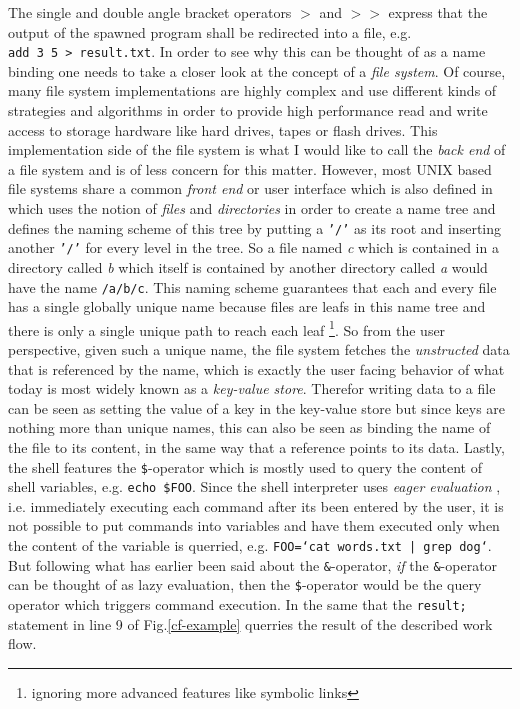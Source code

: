 The single and double angle bracket operators $>$ and $>>$
express that the output of the spawned program shall be redirected into
a file, e.g. \texttt{add\ 3\ 5\ >\ result.txt}. In order to see why this
can be thought of as a name binding one needs to take a closer look
at the concept of a \textit{file system}. Of course, many file
system implementations are highly complex and use different kinds of
strategies and algorithms in order to provide high performance read
and write access to storage hardware like hard drives, tapes or flash
drives. This implementation side of the file system is what I would
like to call the \textit{back end} of a file system and is of less
concern for this matter. However, most
UNIX based file systems share a common \textit{front end} or user
interface which is also defined in \cite{unix78} which uses the notion
of \textit{files} and \textit{directories} in order to create a name tree
and defines the naming scheme of this tree by putting a \texttt{'/'} as its
root and inserting another \texttt{'/'} for every level in the tree. So
a file named \textit{c} which is contained in a directory called \textit{b}
which itself is contained by another directory called \textit{a} would
have the name \texttt{/a/b/c}.
This naming scheme guarantees that each and every file has a single
globally unique name because files are leafs in this name tree and
there is only a single unique path to reach each leaf
\footnote{ignoring more advanced features like symbolic links}.
So from the user perspective, given such a unique name, the file system
fetches the \textit{unstructed} data that is referenced by the name,
which is exactly the user facing behavior of what today is most widely
known as a \textit{key-value store}.
Therefor writing data to a file can be seen as setting the value of
a key in the key-value store but since keys are nothing more than
unique names, this can also be seen as binding the name of the file
to its content, in the same way that a reference points to its data.
\newline
Lastly, the shell features the \texttt{\$}-operator which is mostly used to
query the content of shell variables, e.g. \texttt{echo \$FOO}.
Since the shell interpreter uses \textit{eager evaluation} \cite{eagereval},
i.e. immediately executing each command after its been entered by the
user, it is not possible to put commands into variables and have them
executed only when the content of the variable is querried, e.g.
\texttt{FOO=`cat words.txt | grep dog`}. But following what has earlier
been said about the \texttt{\&}-operator, \textit{if} the
\texttt{\&}-operator can be thought of as lazy evaluation, then the
\texttt{\$}-operator would be the query operator which triggers
command execution. In the same that the \texttt{result;} statement
in line 9 of Fig.\ref{cf-example} querries the result of the described work flow.
\newline

